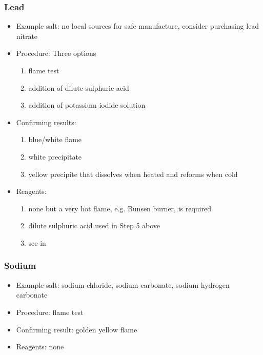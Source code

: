 \subsubsection{Lead}
\begin{itemize}
\item{Example salt: no local sources for safe manufacture, 
consider purchasing lead nitrate}

\item{Procedure: Three options
\begin{enumerate}
\item{flame test} 
\item{addition of dilute sulphuric acid}
\item{addition of potassium iodide solution}
\end{enumerate}
} %

\item{Confirming results:
\begin{enumerate}
\item{blue/white flame}
\item{white precipitate}
\item{yellow precipite that dissolves when heated and reforms when cold}
\end{enumerate}
} %

\item{Reagents:
\begin{enumerate}
\item{none but a very hot flame, e.g. Bunsen burner, is required} 
\item{dilute sulphuric acid used in Step 5 above}
\item{see  in }
\end{enumerate}
} %

\end{itemize} %

\subsubsection{Sodium}
\begin{itemize}
\item{Example salt: sodium chloride, 
sodium carbonate, 
sodium hydrogen carbonate}
\item{Procedure: flame test}
\item{Confirming result: golden yellow flame}
\item{Reagents: none}
\end{itemize}

